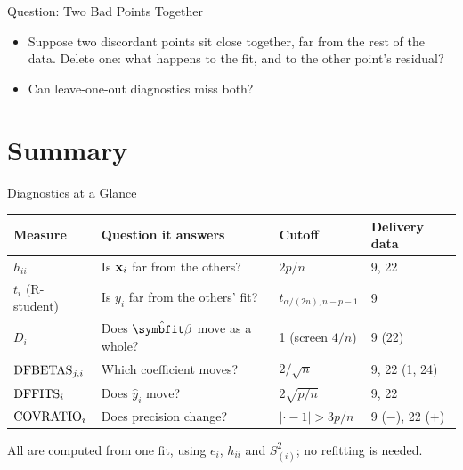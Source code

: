 \begin{frame}{Question: Two Bad Points Together}
    \begin{itemize}
        \item Suppose two discordant points sit close together, far from the rest of the data. Delete one: what happens to the fit, and to the other point's residual?
        \item Can leave-one-out diagnostics miss both?
    \end{itemize}
\end{frame}


\section{Summary}


\begin{frame}{Diagnostics at a Glance}
    \begin{center}
        \footnotesize
        \setlength{\tabcolsep}{4pt}
        \begin{tabular}{llll}
            \toprule
            Measure & Question it answers & Cutoff & Delivery data \\
            \midrule
            $h_{ii}$ & Is $\mathbf{x}_i$ far from the others? & $2p/n$ & 9, 22 \\
            $t_i$ (R-student) & Is $y_i$ far from the others' fit? & $t_{\alpha/(2n),n-p-1}$ & 9 \\
            $D_i$ & Does $\hat{\bbeta}$ move as a whole? & 1 (screen $4/n$) & 9 (22) \\
            $\mathrm{DFBETAS}_{j,i}$ & Which coefficient moves? & $2/\sqrt n$ & 9, 22 (1, 24) \\
            $\mathrm{DFFITS}_i$ & Does $\hat y_i$ move? & $2\sqrt{p/n}$ & 9, 22 \\
            $\mathrm{COVRATIO}_i$ & Does precision change? & $|\cdot-1|>3p/n$ & 9 ($-$), 22 ($+$) \\
            \bottomrule
        \end{tabular}
    \end{center}
    All are computed from one fit, using $e_i$, $h_{ii}$ and $S_{(i)}^2$; no refitting is needed.
\end{frame}


